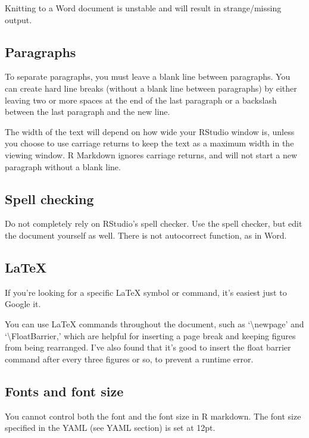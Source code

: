 \documentclass[12pt,]{article}
\begin{document}
Knitting to a Word document is unstable and will result in
strange/missing output.

\subsection{Paragraphs}\label{paragraphs}

To separate paragraphs, you must leave a blank line between paragraphs.
You can create hard line breaks (without a blank line between
paragraphs) by either leaving two or more spaces at the end of the last
paragraph or a backslash between the last paragraph and the new line.

The width of the text will depend on how wide your RStudio window is,
unless you choose to use carriage returns to keep the text as a maximum
width in the viewing window. R Markdown ignores carriage returns, and
will not start a new paragraph without a blank line.

\subsection{Spell checking}\label{spell-checking}

Do not completely rely on RStudio's spell checker. Use the spell
checker, but edit the document yourself as well. There is not
autocorrect function, as in Word.

\subsection{LaTeX}\label{latex}

If you're looking for a specific LaTeX symbol or command, it's easiest
just to Google it.

You can use LaTeX commands throughout the document, such as
`\textbackslash{}newpage' and `\textbackslash{}FloatBarrier,' which are
helpful for inserting a page break and keeping figures from being
rearranged. I've also found that it's good to insert the float barrier
command after every three figures or so, to prevent a runtime error.

\subsection{Fonts and font size}\label{fonts-and-font-size}

You cannot control both the font and the font size in R markdown. The
font size specified in the YAML (see YAML section) is set at 12pt.
\end{document}
